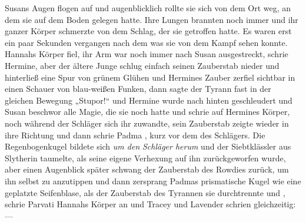 Susans Augen flogen auf und augenblicklich rollte sie sich von dem Ort weg, an dem sie auf dem Boden gelegen hatte. Ihre Lungen brannten noch immer und ihr ganzer Körper schmerzte von dem Schlag, der sie getroffen hatte. Es waren erst ein paar Sekunden vergangen nach dem was sie von dem Kampf sehen konnte. Hannahs Körper fiel, ihr Arm war noch immer nach Susan ausgestreckt,  schrie Hermine, aber der ältere Junge schlug einfach seinen Zauberstab nieder und hinterließ eine Spur von grünem Glühen und Hermines Zauber zerfiel sichtbar in einen Schauer von blau-weißen Funken, dann sagte der Tyrann fast in der gleichen Bewegung „Stupor!“ und Hermine wurde nach hinten geschleudert und Susan beschwor alle Magie, die sie noch hatte und schrie  auf Hermines Körper, noch während der Schläger sich ihr zuwandte, sein Zauberstab zeigte wieder in ihre Richtung und dann schrie Padma  , kurz vor dem  des Schlägers. Die Regenbogenkugel bildete sich \emph{um den} \emph{Schläger herum} und der Siebtklässler aus Slytherin taumelte, als seine eigene Verhexung auf ihn zurückgeworfen wurde, aber einen Augenblick später schwang der Zauberstab des Rowdies zurück, um ihn selbst zu anzutippen und dann zersprang Padmas prismatische Kugel wie eine geplatzte Seifenblase, als der Zauberstab des Tyrannen sie durchtrennte und  , schrie Parvati Hannahs Körper an und Tracey und Lavender schrien gleichzeitig: —

